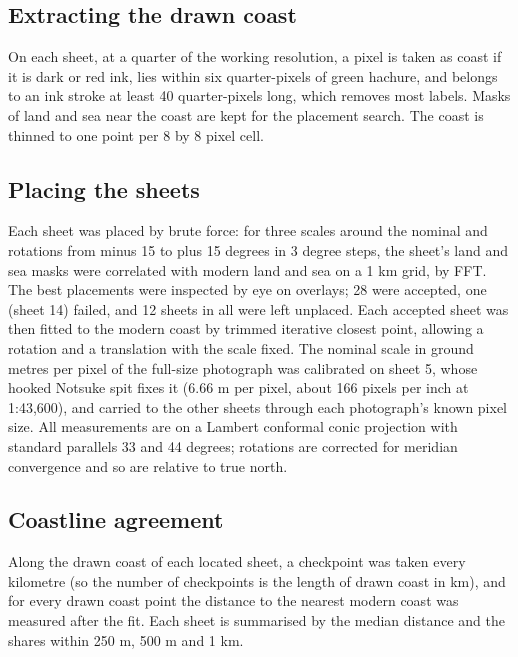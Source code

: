 \documentclass[11pt,a4paper]{article}
\begin{document}
\subsection{Extracting the drawn coast}
On each sheet, at a quarter of the working resolution, a pixel is taken as coast if it is dark or red ink, lies within six quarter-pixels of green hachure, and belongs to an ink stroke at least 40 quarter-pixels long, which removes most labels. Masks of land and sea near the coast are kept for the placement search. The coast is thinned to one point per 8 by 8 pixel cell.

\subsection{Placing the sheets}
Each sheet was placed by brute force: for three scales around the nominal and rotations from minus 15 to plus 15 degrees in 3 degree steps, the sheet's land and sea masks were correlated with modern land and sea on a 1 km grid, by FFT. The best placements were inspected by eye on overlays; 28 were accepted, one (sheet 14) failed, and 12 sheets in all were left unplaced. Each accepted sheet was then fitted to the modern coast by trimmed iterative closest point, allowing a rotation and a translation with the scale fixed. The nominal scale in ground metres per pixel of the full-size photograph was calibrated on sheet 5, whose hooked Notsuke spit fixes it (6.66 m per pixel, about 166 pixels per inch at 1:43,600), and carried to the other sheets through each photograph's known pixel size. All measurements are on a Lambert conformal conic projection with standard parallels 33 and 44 degrees; rotations are corrected for meridian convergence and so are relative to true north.

\subsection{Coastline agreement}
Along the drawn coast of each located sheet, a checkpoint was taken every kilometre (so the number of checkpoints is the length of drawn coast in km), and for every drawn coast point the distance to the nearest modern coast was measured after the fit. Each sheet is summarised by the median distance and the shares within 250 m, 500 m and 1 km.
\end{document}
